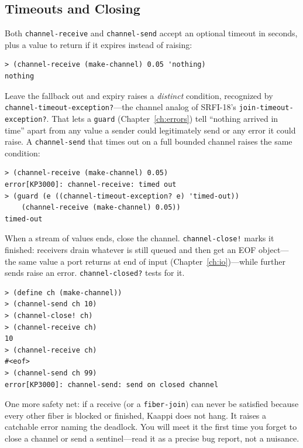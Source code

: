 \subsection{Timeouts and Closing}

Both \texttt{channel-receive} and \texttt{channel-send} accept an optional timeout in seconds, plus a value to return if it expires instead of raising:

\begin{lstlisting}[style=repl]
> (channel-receive (make-channel) 0.05 'nothing)
nothing
\end{lstlisting}

Leave the fallback out and expiry raises a \emph{distinct} condition, recognized by \texttt{channel-timeout-exception?}---the channel analog of SRFI-18's \texttt{join-timeout-exception?}. That lets a \texttt{guard} (Chapter~\ref{ch:errors}) tell ``nothing arrived in time'' apart from any value a sender could legitimately send or any error it could raise. A \texttt{channel-send} that times out on a full bounded channel raises the same condition:

\begin{lstlisting}[style=repl]
> (channel-receive (make-channel) 0.05)
error[KP3000]: channel-receive: timed out
> (guard (e ((channel-timeout-exception? e) 'timed-out))
    (channel-receive (make-channel) 0.05))
timed-out
\end{lstlisting}

When a stream of values ends, close the channel. \texttt{channel-close!} marks it finished: receivers drain whatever is still queued and then get an EOF object---the same value a port returns at end of input (Chapter~\ref{ch:io})---while further sends raise an error. \texttt{channel-closed?} tests for it.

\begin{lstlisting}[style=repl]
> (define ch (make-channel))
> (channel-send ch 10)
> (channel-close! ch)
> (channel-receive ch)
10
> (channel-receive ch)
#<eof>
> (channel-send ch 99)
error[KP3000]: channel-send: send on closed channel
\end{lstlisting}

One more safety net: if a receive (or a \texttt{fiber-join}) can never be satisfied because every other fiber is blocked or finished, Kaappi does not hang. It raises a catchable error naming the deadlock. You will meet it the first time you forget to close a channel or send a sentinel---read it as a precise bug report, not a nuisance.

